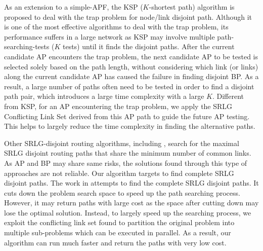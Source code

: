 As an extension to a simple-APF, the KSP ($K$-shortest path) algorithm \cite{eppstein1998finding}  is proposed to deal with the trap problem for node/link disjoint path. Although it is one of the most effective algorithms to deal with the trap problem,  its performance suffers in a large network  as KSP may involve multiple path-searching-tests ($K$ tests) until it finds the disjoint paths. After the current candidate AP encounters the trap problem, the next candidate AP to be tested is selected solely based on the path length, without considering which link (or links) along the current candidate AP has caused the failure in finding disjoint BP. As a result, a large number of paths often need to be tested in order to find a disjoint path pair, which introduces a large time complexity with a large $K$. Different from KSP, for an  AP encountering the trap problem, we apply the SRLG Conflicting Link Set derived from this AP path to guide the future AP testing. This helps to largely reduce the time complexity in finding the alternative paths.

Other SRLG-disjoint routing algorithms, including \cite{rostami2012msdp,rostami2007cose,datta2008graph,xu2003new,todimala2004imsh}, search for the maximal SRLG disjoint routing paths that share the minimum number of common links. As AP and BP may share same risks, the solutions found through this type of approaches are not reliable. Our algorithm targets to find complete SRLG disjoint paths. The work in \cite{xu2003trap} attempts to find the complete SRLG disjoint paths.  It cuts down the problem search space to speed up the path searching process. However, it may return paths with large cost as the space after cutting down may lose the optimal solution. %
Instead, to largely speed up the searching process, we exploit the conflicting link set found to partition the original problem into multiple sub-problems which can  be executed in parallel. As a result, our algorithm can run much faster and return the paths with very low cost. %


